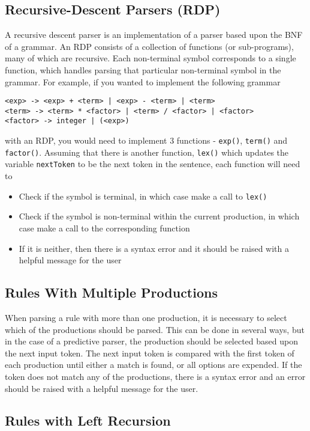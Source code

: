 \subsection*{Recursive-Descent Parsers (RDP)}

A recursive descent parser is an implementation of a parser based upon the BNF of a grammar. An RDP consists of a
 collection of functions (or sub-programs), many of which are recursive. Each non-terminal symbol corresponds to a
 single function, which handles parsing that particular non-terminal symbol in the grammar. For example, if you wanted
 to implement the following grammar
\begin{verbatim}
<exp> -> <exp> + <term> | <exp> - <term> | <term>
<term> -> <term> * <factor> | <term> / <factor> | <factor>
<factor> -> integer | (<exp>)
\end{verbatim}
with an RDP, you would need to implement 3 functions - \verb`exp()`, \verb`term()` and \verb`factor()`. Assuming that
 there is another function, \verb`lex()` which updates the variable \verb`nextToken` to be the next token in the
 sentence, each function will need to
\begin{itemize}
  \item Check if the symbol is terminal, in which case make a call to \verb`lex()`
  \item Check if the symbol is non-terminal within the current production, in which case make a call to the corresponding
   function
  \item If it is neither, then there is a syntax error and it should be raised with a helpful message for the user
\end{itemize}

\subsection*{Rules With Multiple Productions}

When parsing a rule with more than one production, it is necessary to select which of the productions should be parsed.
 This can be done in several ways, but in the case of a predictive parser, the production should be selected based upon
 the next input token. The next input token is compared with the first token of each production until either a match is
 found, or all options are expended. If the token does not match any of the productions, there is a syntax error and an
 error should be raised with a helpful message for the user.

\subsection*{Rules with Left Recursion}


